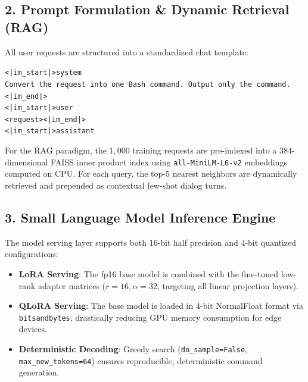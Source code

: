 \documentclass[11pt,a4paper]{report}
\begin{document}
\subsection{2. Prompt Formulation \& Dynamic Retrieval (RAG)}
All user requests are structured into a standardized chat template:
\begin{center}
\texttt{<|im\_start|>system}\\
\texttt{Convert the request into one Bash command. Output only the command.<|im\_end|>}\\
\texttt{<|im\_start|>user}\\
\texttt{<request><|im\_end|>}\\
\texttt{<|im\_start|>assistant}\\
\end{center}
For the RAG paradigm, the $1,000$ training requests are pre-indexed into a $384$-dimensional FAISS inner product index using \texttt{all-MiniLM-L6-v2} embeddings computed on CPU. For each query, the top-5 nearest neighbors are dynamically retrieved and prepended as contextual few-shot dialog turns.

\subsection{3. Small Language Model Inference Engine}
The model serving layer supports both 16-bit half precision and 4-bit quantized configurations:
\begin{itemize}
    \item \textbf{LoRA Serving}: The fp16 base model is combined with the fine-tuned low-rank adapter matrices ($r=16, \alpha=32$, targeting all linear projection layers).
    \item \textbf{QLoRA Serving}: The base model is loaded in 4-bit NormalFloat format via \texttt{bitsandbytes}, drastically reducing GPU memory consumption for edge devices.
    \item \textbf{Deterministic Decoding}: Greedy search (\texttt{do\_sample=False}, \texttt{max\_new\_tokens=64}) ensures reproducible, deterministic command generation.
\end{itemize}
\end{document}
